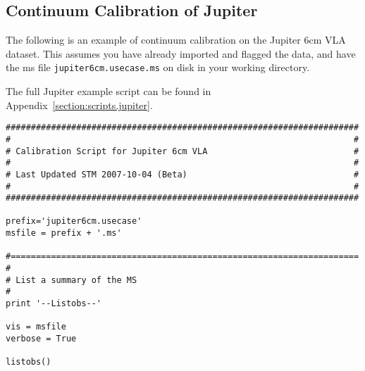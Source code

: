 \subsection{Continuum Calibration of Jupiter}
\label{section:cal.examples.jupiter}

The following is an example of continuum calibration 
on the Jupiter 6cm VLA dataset.  
This assumes you have already imported and flagged the data,
and have the ms file {\tt jupiter6cm.usecase.ms} 
on disk in your working directory.

The full Jupiter example script can be found in
Appendix~\ref{section:scripts.jupiter}.

\small
\begin{verbatim}
######################################################################
#                                                                    #
# Calibration Script for Jupiter 6cm VLA                             #
#                                                                    #
# Last Updated STM 2007-10-04 (Beta)                                 #
#                                                                    #
######################################################################

prefix='jupiter6cm.usecase'
msfile = prefix + '.ms'

#=====================================================================
#
# List a summary of the MS
#
print '--Listobs--'

vis = msfile
verbose = True

listobs()


\end{verbatim}
